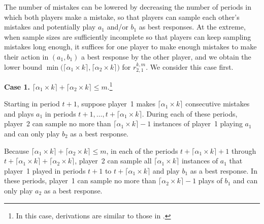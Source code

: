 \documentclass[11.5pt]{article}
\begin{document}
The number of mistakes can be lowered by decreasing the number of periods in which both players make a mistake, so that players can sample each other's mistakes and potentially play $a_1$ and/or $b_1$ as best responses. 
At the extreme, when sample sizes are sufficiently incomplete so that players can keep sampling mistakes long enough, it suffices for one player to make enough mistakes to make their action in $(a_1,b_1)$ a best response by the other player, and we obtain the lower bound $\min\big(\lceil \alpha_1 \times k \rceil,\lceil \alpha_2 \times k \rceil\big)$ for $r_{2,1}^{k,m}$. 
We consider this case first. 

{\bf Case 1.} $\lceil \alpha_1 \times k \rceil + \lceil \alpha_2 \times k \rceil \leq m$.\footnote{In this case, derivations are similar to those in \cite{Young1998}.} 
%

Starting in period $t+1$, suppose player~1 makes $\lceil \alpha_1 \times k \rceil$ consecutive mistakes and plays $a_1$ in periods $t+1, \dots, t+ \lceil \alpha_1 \times k \rceil$. During each of these periods, player~2 can sample no more than $\lceil \alpha_1 \times k \rceil - 1$ instances of player~1 playing $a_1$ and can only play $b_2$ as a best response.

Because $\lceil \alpha_1 \times k \rceil + \lceil \alpha_2 \times k \rceil \leq m$, in each of the periods $t+\lceil \alpha_1 \times k \rceil + 1$ through $t + \lceil \alpha_1 \times k \rceil + \lceil \alpha_2 \times k \rceil$, player~2 can sample all $ \lceil \alpha_1 \times k \rceil $ instances of $a_1$ that player~1 played in periods $t+1$ to $t+\lceil \alpha_1 \times k \rceil$ and play $b_1$ as a best response. In these periods, player~1 can sample no more than $\lceil \alpha_2 \times k \rceil - 1$ plays of $b_1$ and can only play $a_2$ as a best response.
\end{document}
